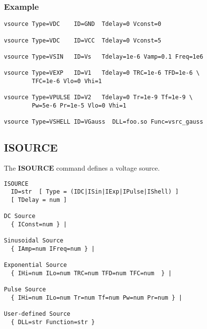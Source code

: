\documentclass[oneside,12pt]{cgd_book}
\begin{document}
\subsubsection{Example}
\begin{lstlisting}[style=GeniusCode]
vsource Type=VDC    ID=GND  Tdelay=0 Vconst=0

vsource Type=VDC    ID=VCC  Tdelay=0 Vconst=5

vsource Type=VSIN   ID=Vs   Tdelay=1e-6 Vamp=0.1 Freq=1e6

vsource Type=VEXP   ID=V1   Tdelay=0 TRC=1e-6 TFD=1e-6 \
        TFC=1e-6 Vlo=0 Vhi=1

vsource Type=VPULSE ID=V2   Tdelay=0 Tr=1e-9 Tf=1e-9 \
        Pw=5e-6 Pr=1e-5 Vlo=0 Vhi=1

vsource Type=VSHELL ID=VGauss  DLL=foo.so Func=vsrc_gauss
\end{lstlisting}
\par
\subsection{ISOURCE}
The $\mathbf{ISOURCE}$
command defines a voltage source.
\par
\begin{lstlisting}[style=GeniusCmd]
ISOURCE
  ID=str  [ Type = (IDC|ISin|IExp|IPulse|IShell) ]
  [ TDelay = num ]

DC Source
  { IConst=num } |

Sinusoidal Source
  { IAmp=num IFreq=num } |

Exponential Source
  { IHi=num ILo=num TRC=num TFD=num TFC=num  } |

Pulse Source
  { IHi=num ILo=num Tr=num Tf=num Pw=num Pr=num } |

User-defined Source
  { DLL=str Function=str }
\end{lstlisting}
\end{document}
